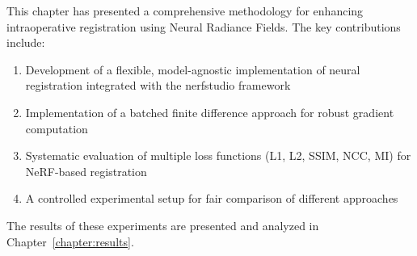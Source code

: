 This chapter has presented a comprehensive methodology for enhancing intraoperative registration using Neural Radiance Fields. The key contributions include:

\begin{enumerate}
    \item Development of a flexible, model-agnostic implementation of neural registration integrated with the nerfstudio framework
    \item Implementation of a batched finite difference approach for robust gradient computation
    \item Systematic evaluation of multiple loss functions (L1, L2, SSIM, NCC, MI) for NeRF-based registration
    \item A controlled experimental setup for fair comparison of different approaches
\end{enumerate}

The results of these experiments are presented and analyzed in Chapter~\ref{chapter:results}. 